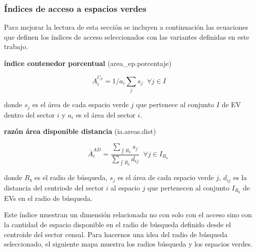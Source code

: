 \documentclass[12pt,]{book}
\begin{document}
\subsubsection{Índices de acceso a espacios
verdes}\label{indices-de-acceso-a-espacios-verdes}

Para mejorar la lectura de esta sección se incluyen a continuación las
ecuaciones que definen los índices de acceso seleccionados con las
variantes definidas en este trabajo.

\textbf{índice contenedor porcentual} (area\_ep.porcentaje)

\begin{equation}
A^{C_p}_i =1/a_i\sum_j{s_j} \;  \; \forall  j \in I
\label{eq:n-cont}
\end{equation}

donde \(s_j\) es el área de cada espacio verde \(j\) que pertenece al
conjunto \(I\) de EV dentro del sector \(i\) y \(a_i\) es el área del
sector \(i\).

\textbf{razón área disponible distancia} (ia.areas.dist)

\begin{equation}
\bar{A}^{AD}_i= \frac{\sum_{\int R_b }{s_j}}{\sum_{\int R_b }{d_{ij}}}  \;  \; \forall  j \in I_{R_b} \; 
\label{eq:areas-dists}
\end{equation}

donde \(R_b\) es el radio de búsqueda, \(s_j\) es el área de cada
espacio verde \(j\), \(d_{ij}\) es la distancia del centriode del sector
\(i\) al espacio \(j\) que pertenecen al conjunto \(I_{R_b}\) de EVs en
el radio de búsqueda.

Este índice muestran un dimensión relacionada no con solo con el acceso
sino con la cantidad de espacio disponible en el radio de búsqueda
definido desde el centroide del sector censal. Para hacernos una idea
del radio de búsqueda seleccionado, el siguiente mapa muestra los radios
búsqueda y los espacios verdes.
\end{document}
